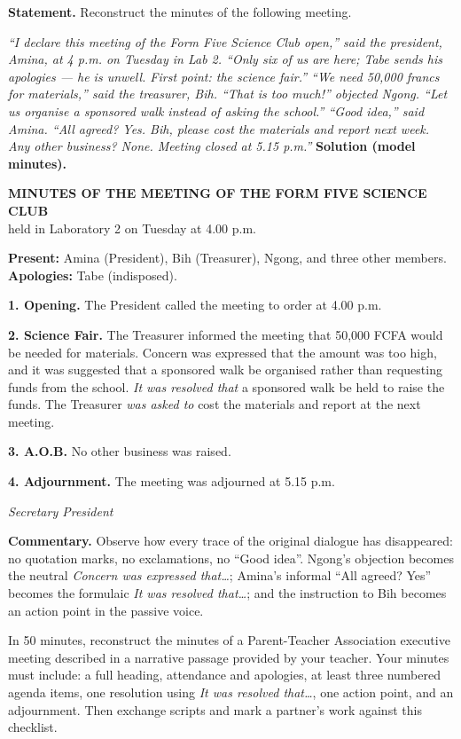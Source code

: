 \documentclass[11pt]{article}
\begin{document}
\begin{exoresolu}
\textbf{Statement.} Reconstruct the minutes of the following meeting.\par
\emph{``I declare this meeting of the Form Five Science Club open,'' said the president, Amina, at 4 p.m. on Tuesday in Lab 2. ``Only six of us are here; Tabe sends his apologies --- he is unwell. First point: the science fair.'' ``We need 50,000 francs for materials,'' said the treasurer, Bih. ``That is too much!'' objected Ngong. ``Let us organise a sponsored walk instead of asking the school.'' ``Good idea,'' said Amina. ``All agreed? Yes. Bih, please cost the materials and report next week. Any other business? None. Meeting closed at 5.15 p.m.''}
\tcblower
\textbf{Solution (model minutes).}\par
\textbf{MINUTES OF THE MEETING OF THE FORM FIVE SCIENCE CLUB}\\ held in Laboratory 2 on Tuesday at 4.00 p.m.\par
\textbf{Present:} Amina (President), Bih (Treasurer), Ngong, and three other members. \textbf{Apologies:} Tabe (indisposed).\par
\textbf{1. Opening.} The President called the meeting to order at 4.00 p.m.\par
\textbf{2. Science Fair.} The Treasurer informed the meeting that 50,000 FCFA would be needed for materials. Concern was expressed that the amount was too high, and it was suggested that a sponsored walk be organised rather than requesting funds from the school. \emph{It was resolved that} a sponsored walk be held to raise the funds. The Treasurer \emph{was asked to} cost the materials and report at the next meeting.\par
\textbf{3. A.O.B.} No other business was raised.\par
\textbf{4. Adjournment.} The meeting was adjourned at 5.15 p.m.\par
\emph{Secretary \hfill President}\par
\textbf{Commentary.} Observe how every trace of the original dialogue has disappeared: no quotation marks, no exclamations, no ``Good idea''. Ngong's objection becomes the neutral \emph{Concern was expressed that\ldots}; Amina's informal ``All agreed? Yes'' becomes the formulaic \emph{It was resolved that\ldots}; and the instruction to Bih becomes an action point in the passive voice.
\end{exoresolu}

\begin{exercice}
In 50 minutes, reconstruct the minutes of a Parent-Teacher Association executive meeting described in a narrative passage provided by your teacher. Your minutes must include: a full heading, attendance and apologies, at least three numbered agenda items, one resolution using \emph{It was resolved that\ldots}, one action point, and an adjournment. Then exchange scripts and mark a partner's work against this checklist.
\end{exercice}
\end{document}
